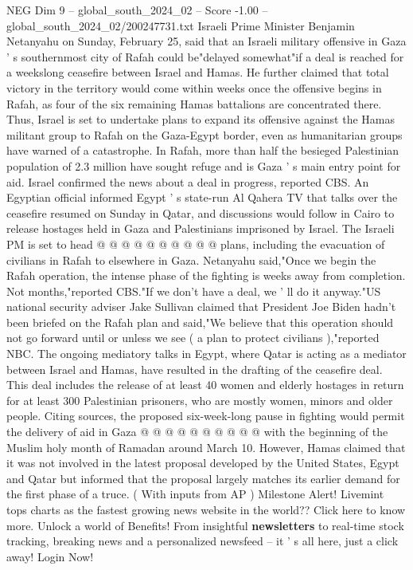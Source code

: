 \begin{textsample}{NEG Dim 9 – global\_south\_2024\_02 – Score -1.00 – global\_south\_2024\_02/200247731.txt}  \label{ex:f9_neg_363}
Israeli Prime Minister Benjamin Netanyahu on Sunday, February 25, said that an Israeli military offensive in Gaza ' s southernmost city of Rafah could be"delayed somewhat"if a deal is reached for a weekslong ceasefire between Israel and Hamas.
He further claimed that total victory in the territory would come within weeks once the offensive begins in Rafah, as four of the six remaining Hamas battalions are concentrated there.
Thus, Israel is set to undertake plans to expand its offensive against the Hamas militant group to Rafah on the Gaza-Egypt border, even as humanitarian groups have warned of a catastrophe.
In Rafah, more than half the besieged Palestinian population of 2.3 million have sought refuge and is Gaza ' s main entry point for aid.
Israel confirmed the news about a deal in progress, reported CBS.
An Egyptian official informed Egypt ' s state-run Al Qahera TV that talks over the ceasefire resumed on Sunday in Qatar, and discussions would follow in Cairo to release hostages held in Gaza and Palestinians imprisoned by Israel.
The Israeli PM is set to head @ @ @ @ @ @ @ @ @ @ plans, including the evacuation of civilians in Rafah to elsewhere in Gaza.
Netanyahu said,"Once we begin the Rafah operation, the intense phase of the fighting is weeks away from completion.
Not months,"reported CBS."If we don't have a deal, we ' ll do it anyway."US national security adviser Jake Sullivan claimed that President Joe Biden hadn't been briefed on the Rafah plan and said,"We believe that this operation should not go forward until or unless we see ( a plan to protect civilians ),"reported NBC.
The ongoing mediatory talks in Egypt, where Qatar is acting as a mediator between Israel and Hamas, have resulted in the drafting of the ceasefire deal.
This deal includes the release of at least 40 women and elderly hostages in return for at least 300 Palestinian prisoners, who are mostly women, minors and older people.
Citing sources, the proposed six-week-long pause in fighting would permit the delivery of aid in Gaza @ @ @ @ @ @ @ @ @ @ with the beginning of the Muslim holy month of Ramadan around March 10.
However, Hamas claimed that it was not involved in the latest proposal developed by the United States, Egypt and Qatar but informed that the proposal largely matches its earlier demand for the first phase of a truce. ( With inputs from AP ) Milestone Alert!
Livemint tops charts as the fastest growing news website in the world??
Click here to know more.
Unlock a world of Benefits!
From insightful \textbf{newsletters} to real-time stock tracking, breaking news and a personalized newsfeed -- it ' s all here, just a click away!
Login Now!

\end{textsample}
